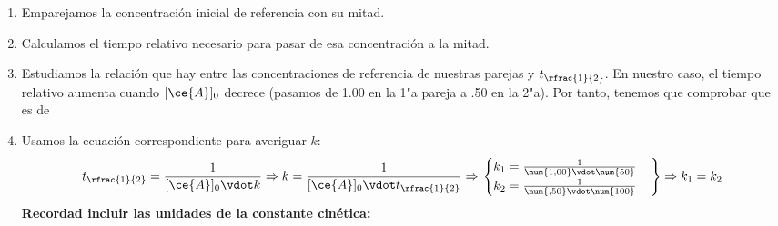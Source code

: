 \begin{frame}
\begin{enumerate}
		\item<2-> Emparejamos la concentración inicial de referencia con su mitad.
		\item<3-> Calculamos el tiempo relativo necesario para pasar de esa concentración a la mitad.
		\item<4-> Estudiamos la relación que hay entre las concentraciones de referencia de nuestras parejas y $t_{\rfrac{1}{2}}$. En nuestro caso, el tiempo relativo aumenta cuando $[\ce{A}]_0$ decrece (pasamos de \SI{1,00}{\Molar} en la 1"a pareja a \SI{,50}{\Molar} en la 2"a). Por tanto, tenemos que comprobar que es de 
		\item<5-> Usamos la ecuación correspondiente para averiguar $k$:
					$$
						t_{\rfrac{1}{2}} = \frac{1}{[\ce{A}]_0\vdot k}\Rightarrow
						k = \frac{1}{[\ce{A}]_0\vdot t_{\rfrac{1}{2}}}\Rightarrow
						\left.
							\begin{cases}
								k_1 = \frac{1}{\num{1,00}\vdot \num{50}}	\\
								k_2 = \frac{1}{ \num{,50}\vdot\num{100}}
							\end{cases}
						\right\}\Rightarrow
						k_1 = k_2
					$$
					\textbf{Recordad incluir las \textbf{unidades} de la \textbf{constante cinética}:}\\
					\begin{center}
						\qquad
					\end{center}
	\end{enumerate}
\end{frame}

